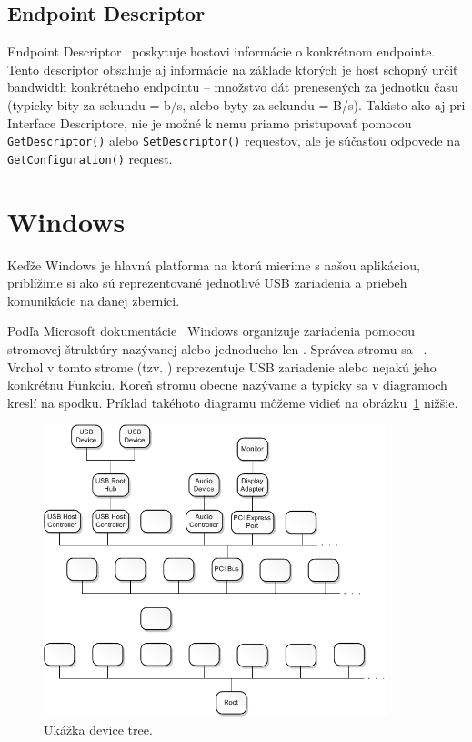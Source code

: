 \subsection*{Endpoint Descriptor}
Endpoint Descriptor~\cite{usb_chap9_end_desc} poskytuje hostovi informácie o konkrétnom endpointe. Tento descriptor obsahuje aj informácie na základe ktorých je host schopný určiť bandwidth konkrétneho endpointu -- množstvo dát prenesených za jednotku času (typicky bity za sekundu = b/s, alebo byty za sekundu = B/s). Takisto ako aj  pri Interface Descriptore, nie je možné k nemu priamo pristupovať pomocou \texttt{GetDescriptor()} alebo \texttt{SetDescriptor()} requestov, ale je súčasťou odpovede na \texttt{GetConfiguration()} request.

\section{Windows}
Keďže Windows je hlavná platforma na ktorú mierime s našou aplikáciou, priblížime si ako sú reprezentované jednotlivé USB zariadenia a priebeh komunikácie na danej zbernici.

Podľa Microsoft dokumentácie~\cite{usb_msdn_device_node_stack} Windows organizuje zariadenia pomocou stromovej štruktúry nazývanej  alebo jednoducho len . Správca stromu sa ~\cite{usb_msdn_pnp_manager}. Vrchol v tomto strome (tzv. ) reprezentuje USB zariadenie alebo nejakú jeho konkrétnu Funkciu. Koreň stromu obecne nazývame  a typicky sa v diagramoch kreslí na spodku. Príklad takéhoto diagramu môžeme vidieť na obrázku~\ref{obr:kap2:device_tree} nižšie.

\begin{figure}[!htb]
	\centering
	\includegraphics[width=10cm]{img/kap02_device_tree}
	\caption{Ukážka device tree.}
	\label{obr:kap2:device_tree}
\end{figure}

